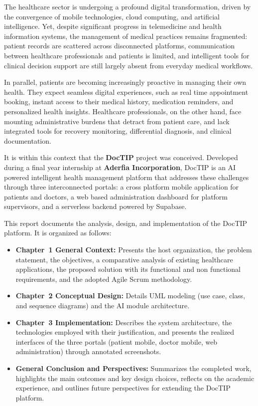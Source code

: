 \documentclass[12pt,a4paper,oneside]{report}
\begin{document}
The healthcare sector is undergoing a profound digital transformation, driven by the convergence of mobile technologies, cloud computing, and artificial intelligence. Yet, despite significant progress in telemedicine and health information systems, the management of medical practices remains fragmented: patient records are scattered across disconnected platforms, communication between healthcare professionals and patients is limited, and intelligent tools for clinical decision support are still largely absent from everyday medical workflows.

In parallel, patients are becoming increasingly proactive in managing their own health. They expect seamless digital experiences, such as real time appointment booking, instant access to their medical history, medication reminders, and personalized health insights. Healthcare professionals, on the other hand, face mounting administrative burdens that detract from patient care, and lack integrated tools for recovery monitoring, differential diagnosis, and clinical documentation.

It is within this context that the \textbf{DocTIP} project was conceived. Developed during a final year internship at \textbf{Aderfia Incorporation}, DocTIP is an AI powered intelligent health management platform that addresses these challenges through three interconnected portals: a cross platform mobile application for patients and doctors, a web based administration dashboard for platform supervisors, and a serverless backend powered by Supabase.

This report documents the analysis, design, and implementation of the DocTIP platform. It is organized as follows:

\begin{itemize}
    \item \textbf{Chapter~1 General Context:} Presents the host organization, the problem statement, the objectives, a comparative analysis of existing healthcare applications, the proposed solution with its functional and non functional requirements, and the adopted Agile Scrum methodology.
    \item \textbf{Chapter~2 Conceptual Design:} Details UML modeling (use case, class, and sequence diagrams) and the AI module architecture.
    \item \textbf{Chapter~3 Implementation:} Describes the system architecture, the technologies employed with their justification, and presents the realized interfaces of the three portals (patient mobile, doctor mobile, web administration) through annotated screenshots.
    \item \textbf{General Conclusion and Perspectives:} Summarizes the completed work, highlights the main outcomes and key design choices, reflects on the academic experience, and outlines future perspectives for extending the DocTIP platform.
\end{itemize}
\end{document}
